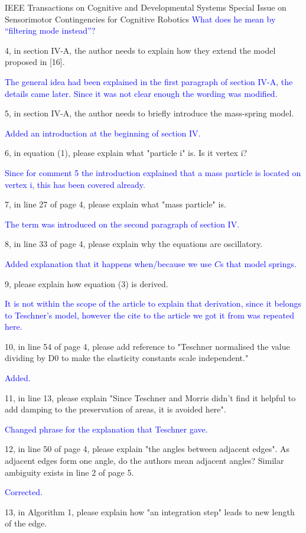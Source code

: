 \documentclass[a4paper,12pt]{letter}
\newcommand{\comment}[1]{\textcolor{blue}{#1}}
\begin{document}
\begin{letter}{IEEE Transactions on Cognitive and Developmental Systems\newline
Special Issue on Sensorimotor Contingencies for Cognitive Robotics}
\comment{What does he mean by ``filtering mode instead''?}

4, in section IV-A, the author needs to explain how they extend the model proposed in [16].

\comment{The general idea had been explained in the first paragraph of section IV-A, the details came later.  Since it was not clear enough the wording was modified.}

5, in section IV-A, the author needs to briefly introduce the mass-spring model.

\comment{Added an introduction at the beginning of section IV.}

6, in equation (1), please explain what "particle i" is. Is it vertex i? 

\comment{Since for comment 5 the introduction explained that a mass particle is located on vertex i, this has been covered already.}

7, in line 27 of page 4, please explain what "mass particle" is.

\comment{The term was introduced on the second paragraph of section IV.}

8, in line 33 of page 4, please explain why the equations are oscillatory.

\comment{Added explanation that it happens when/because we use $C$s that model springs.}

9, please explain how equation (3) is derived.

\comment{It is not within the scope of the article to explain that derivation, since it belongs to Teschner's model, however the cite to the article we got it from was repeated here.}

10, in line 54 of page 4, please add reference to "Teschner normalised the value dividing by D0 to make the elasticity constants scale independent." 

\comment{Added.}

11, in line 13, please explain "Since Teschner and Morris didn’t find it helpful to add damping to the preservation of areas, it is avoided here".

\comment{Changed phrase for the explanation that Teschner gave.}

12, in line 50 of page 4, please explain "the angles between adjacent edges". As adjacent edges form one angle, do the authors mean adjacent angles? Similar ambiguity exists in line 2 of page 5. 

\comment{Corrected.}

13, in Algorithm 1, please explain how "an integration step" leads to new length of the edge. 


\end{letter}
\end{document}
